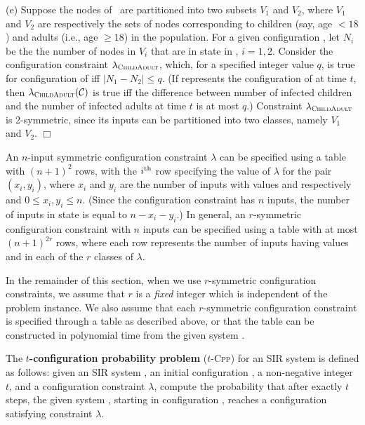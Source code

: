\begin{example}
\begin{description}
\item{(e)} 
Suppose the nodes of~ \cals{} are partitioned into
two subsets $V_1$ and $V_2$, where $V_1$ and $V_2$ are respectively the sets of nodes
corresponding to children (say, age $< 18$) and 
adults (i.e., age $\geq 18$) in the population.
For a given configuration \calc,
let $N_i$ be the the number of nodes in $V_i$ 
that are in state \istate{} in \calc, $i = 1, 2$.
Consider the configuration constraint $\lambda_{\textsc{ChildAdult}}$,
which, for a specified integer value $q$,
is true for configuration \calc{} of \cals{} iff
$|N_1 - N_2| \leq q$.
(If \calc{} represents the configuration of \cals{} at time $t$,
then $\lambda_{\textsc{ChildAdult}}(\mbox{${\cal C}$})$ is true iff the difference between number of infected children
and the number of infected adults at time $t$ is at most $q$.) 
Constraint  $\lambda_{\textsc{ChildAdult}}$ is 2-symmetric,
since its inputs can be partitioned into two classes,
namely $V_1$ and $V_2$.   
\hfill $\Box$
\end{description}
\end{example}

An $n$-input symmetric configuration constraint $\lambda$ can be specified using
a table with $(n+1)^2$ rows, with the $i^{\rm{th}}$ 
row specifying the value of $\lambda$ for 
the pair $(x_i, y_i)$, where $x_i$ and $y_i$ are
the number of inputs with values \sstate{} and \istate{}
respectively and $0 \leq x_i, y_i \leq n$.
(Since the configuration constraint has $n$ inputs, the number of inputs
in state \rstate{} is equal to $n-x_i-y_i$.) 
In general, an $r$-symmetric configuration constraint with $n$ inputs
can be specified using a table with at most $(n+1)^{2r}$ rows,
where each row represents the number of inputs 
having values \sstate{} and \istate{}
in each of the $r$ classes of $\lambda$.

In the remainder of this section, when we use $r$-symmetric configuration constraints,
we assume that $r$ is a \emph{fixed} integer which is independent
of the problem instance.   
We also assume that each $r$-symmetric configuration constraint is specified
through a table as described above, or that
the table can be constructed in polynomial
time from the given system \cals{}.

\newcommand{\tcpp}{\mbox{$t$}-\textsc{Cpp}}

\begin{definition} \label{def:t_config}
The \textbf{$t$-configuration probability problem} (\tcpp)
for an SIR system is defined as follows:
given an SIR system \cals{}, an initial configuration \cali{}, a non-negative
integer $t$, and a configuration constraint $\lambda$, compute
the probability that  after exactly $t$ steps, the given system
\cals{}, starting in configuration \cali{}, reaches a configuration
satisfying constraint $\lambda$.
\end{definition}

